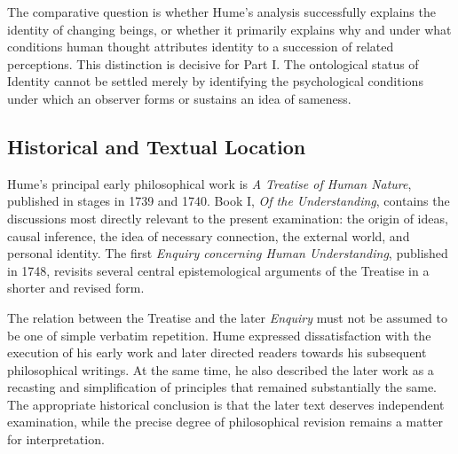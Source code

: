 \label{para:VS.B01.P01.C08.S09.SS01.P004}

The comparative question is whether Hume's analysis
successfully explains the identity of changing beings,
or whether it primarily explains why and under what
conditions human thought attributes identity to a succession
of related perceptions. This distinction is decisive for
Part I. The ontological status of Identity cannot be settled
merely by identifying the psychological conditions under
which an observer forms or sustains an idea of sameness.



\subsection{Historical and Textual Location}
\label{subsec:ch08-hume-historical}

\label{para:VS.B01.P01.C08.S09.SS02.P001}

Hume's principal early philosophical work is
\textit{A Treatise of Human Nature}, published in stages
in 1739 and 1740. Book I, \textit{Of the Understanding},
contains the discussions most directly relevant to the
present examination: the origin of ideas, causal inference,
the idea of necessary connection, the external world,
and personal identity. The first
\textit{Enquiry concerning Human Understanding}, published
in 1748, revisits several central epistemological arguments
of the Treatise in a shorter and revised form.
\cite{HumeTreatise,HumeEnquiry,QuRadcliffeHume2026}

\label{para:VS.B01.P01.C08.S09.SS02.P002}

The relation between the Treatise and the later
\textit{Enquiry} must not be assumed to be one of simple
verbatim repetition. Hume expressed dissatisfaction with
the execution of his early work and later directed readers
towards his subsequent philosophical writings. At the same
time, he also described the later work as a recasting and
simplification of principles that remained substantially
the same. The appropriate historical conclusion is that
the later text deserves independent examination, while
the precise degree of philosophical revision remains a
matter for interpretation.
\cite{QuRadcliffeHume2026}

